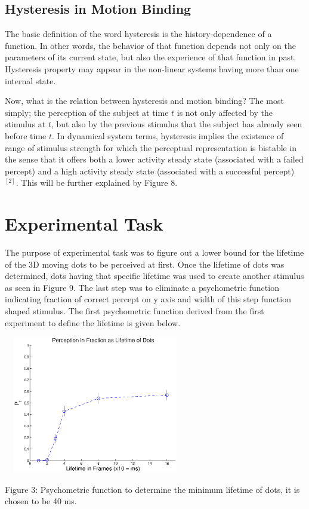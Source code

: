 \documentclass[twocolumn]{article}
\begin{document}
\subsection{Hysteresis in Motion Binding}
The basic definition of the word hysteresis is the history-dependence of a function. In other words, the behavior of that function depends not only on the parameters of its current state, but also the experience of that function in past. Hysteresis property may appear in the non-linear systems having more than one internal state. 

Now, what is the relation between hysteresis and motion binding? The most simply; the perception of the subject at time $t$ is not only affected by the stimulus at $t$, but also by the previous stimulus that the subject has already seen before time $t$. 
In dynamical system terms, hysteresis implies the existence of range of stimulus strength for which the perceptual representation is bistable in the sense that it offers both a lower activity steady state (associated with a failed percept) and a high activity steady state (associated with a successful percept) $^{[2]}$. This will be further explained by Figure 8. 

\section{Experimental Task}

The purpose of experimental task was to figure out a lower bound for the lifetime of the 3D moving dots to be perceived at first. Once the lifetime of dots was determined, dots having that specific lifetime was used to create another stimulus as seen in Figure 9. The last step was to eliminate a psychometric function indicating fraction of correct percept on y axis and width of this step function shaped stimulus. The first psychometric function derived from the first experiment to define the lifetime is given below. 
\begin{center}
\includegraphics[width=80mm,height=60mm]{p_correct.eps} 
   \begin{footnotesize} Figure 3: Psychometric function to determine the minimum lifetime of dots, it is chosen to be 40 ms. \end{footnotesize}
\end{center}
\end{document}
